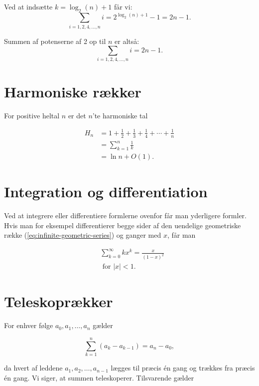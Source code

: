         Ved at indsætte \(k = \log_2(n) + 1\) får vi:
        \[
            \sum_{i=1,2,4,\ldots,n} i = 2^{\log_2(n)+1} - 1 = 2n - 1.
        \]
        
        Summen af potenserne af 2 op til \(n\) er altså:
        \[
            \sum_{i=1,2,4,\ldots,n} i = 2n - 1.
        \]
        

\section*{Harmoniske rækker}
For positive heltal $n$ er det $n$'te harmoniske tal

\begin{align}
    H_n & = 1 + \frac{1}{2} + \frac{1}{3} + \frac{1}{4} + \cdots + \frac{1}{n} \nonumber \\
        & = \sum_{k=1}^n \frac{1}{k} \label{eq:harmonic_sum} \\
        & = \ln n + O(1) . \label{eq:approximation}
\end{align}

\section*{Integration og differentiation}
Ved at integrere eller differentiere formlerne ovenfor får man yderligere formler. Hvis man for eksempel differentierer begge sider af den uendelige geometriske række (\ref{eq:infinite-geometric-series}) og ganger med $x$, får man


\begin{equation}
    \begin{aligned}
    & \sum_{k=0}^{\infty} k x^k=\frac{x}{(1-x)^2} \\ 
    & \text { for }|x|<1 . \label{eq:diff-geometric-series}
    \end{aligned}
\end{equation}

\section*{Teleskoprækker}

For enhver følge $a_0, a_1, \ldots, a_n$ gælder

\begin{equation}
    \sum_{k=1}^n\left(a_k-a_{k-1}\right)=a_n-a_0, \label{eq:telescoping-series}
\end{equation}

da hvert af leddene $a_1, a_2, \ldots, a_{n-1}$ lægges til præcis én gang og trækkes fra præcis én gang. Vi siger, at summen teleskoperer. Tilsvarende gælder

